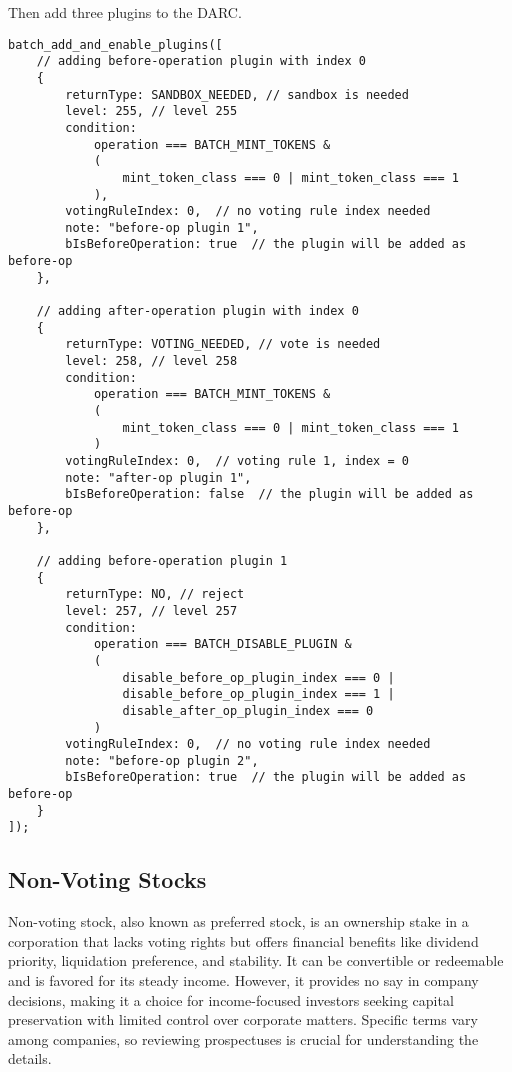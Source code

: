 \documentclass[main.tex]{subfiles}
\begin{document}
Then add three plugins to the DARC. 
\begin{verbatim}
batch_add_and_enable_plugins([
    // adding before-operation plugin with index 0
    {
        returnType: SANDBOX_NEEDED, // sandbox is needed
        level: 255, // level 255
        condition:
            operation === BATCH_MINT_TOKENS & 
            ( 
                mint_token_class === 0 | mint_token_class === 1
            ),
        votingRuleIndex: 0,  // no voting rule index needed
        note: "before-op plugin 1",
        bIsBeforeOperation: true  // the plugin will be added as before-op
    },

    // adding after-operation plugin with index 0
    {
        returnType: VOTING_NEEDED, // vote is needed
        level: 258, // level 258
        condition:
            operation === BATCH_MINT_TOKENS & 
            ( 
                mint_token_class === 0 | mint_token_class === 1
            )
        votingRuleIndex: 0,  // voting rule 1, index = 0
        note: "after-op plugin 1",
        bIsBeforeOperation: false  // the plugin will be added as before-op
    },

    // adding before-operation plugin 1
    {
        returnType: NO, // reject
        level: 257, // level 257
        condition:
            operation === BATCH_DISABLE_PLUGIN & 
            ( 
                disable_before_op_plugin_index === 0 | 
                disable_before_op_plugin_index === 1 |
                disable_after_op_plugin_index === 0
            )
        votingRuleIndex: 0,  // no voting rule index needed
        note: "before-op plugin 2",
        bIsBeforeOperation: true  // the plugin will be added as before-op
    }
]);
\end{verbatim}

\subsection{Non-Voting Stocks}

Non-voting stock, also known as preferred stock, is an ownership stake in a corporation that lacks voting rights but offers financial benefits like dividend priority, liquidation preference, and stability. It can be convertible or redeemable and is favored for its steady income. However, it provides no say in company decisions, making it a choice for income-focused investors seeking capital preservation with limited control over corporate matters. Specific terms vary among companies, so reviewing prospectuses is crucial for understanding the details.
\end{document}
